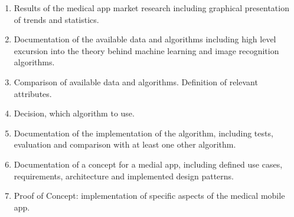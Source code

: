 \noindent
\begin{enumerate}
\item Results of the medical app market research including graphical presentation of trends and statistics.
\item Documentation of the available data and algorithms including high level excursion into the theory behind machine learning and image recognition algorithms.
\item Comparison of available data and algorithms. Definition of relevant attributes.
\item Decision, which algorithm to use.
\item Documentation of the implementation of the algorithm, including tests, evaluation and comparison with at least one other algorithm.
\item Documentation of a concept for a medial app, including defined use cases, requirements, architecture and implemented design patterns.
\item Proof of Concept: implementation of specific aspects of the medical mobile app.
\end{enumerate}
